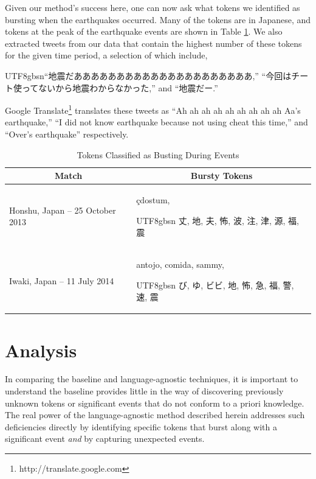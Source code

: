 \documentclass{sig-alternate}
\newcommand{\myfont}{gbsn}
\begin{document}
Given our method's success here, one can now ask what tokens we identified as bursting when the earthquakes occurred.
Many of the tokens are in Japanese, and tokens at the peak of the earthquake events are shown in Table \ref{tab:japanTokens}.
We also extracted tweets from our data that contain the highest number of these tokens for the given time period, a selection of which include, \begin{CJK}{UTF8}{\myfont}``地震だあああああああああああああああああああああ,'' ``今回はチート使ってないから地震わからなかった,'' and ``地震だー.'' \end{CJK}
Google Translate\footnote{http://translate.google.com} translates these tweets as ``Ah ah ah ah ah ah ah ah ah Aa's earthquake,'' ``I did not know earthquake because not using cheat this time,'' and ``Over's earthquake'' respectively.

\begin{table}[htdp]
\caption{Tokens Classified as Busting During Events}
\begin{center}
\begin{tabular}{|p{1.45in} | p{1.45in} |}
\hline
\multicolumn{1}{|c|}{\textbf{Match}} & \multicolumn{1}{|c|}{\textbf{Bursty Tokens}} \\ \hline
Honshu, Japan -- 25 October 2013 & \c{c}dostum, \begin{CJK}{UTF8}{\myfont} 丈, 地, 夫, 怖, 波, 注, 津, 源, 福, 震 \end{CJK} \\ \hline
Iwaki, Japan -- 11 July 2014 & antojo, comida, sammy, \begin{CJK}{UTF8}{\myfont} び, ゆ, ビビ, 地, 怖, 急, 福, 警, 速, 震 \end{CJK} \\ \hline
\end{tabular}
\end{center}
\label{tab:japanTokens}
\end{table}

\section{Analysis}
\label{sect:analysis}

In comparing the baseline and language-agnostic techniques, it is important to understand the baseline provides little in the way of discovering previously unknown tokens or significant events that do not conform to a priori knowledge.
The real power of the language-agnostic method described herein addresses such deficiencies directly by identifying specific tokens that burst along with a significant event \emph{and} by capturing unexpected events.
\end{document}
